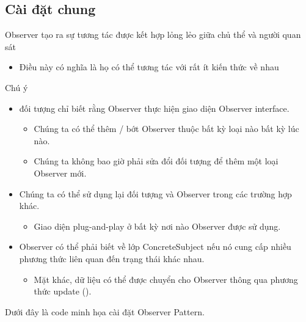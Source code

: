 \subsection{Cài đặt chung}
Observer tạo ra sự tương tác được kết hợp lỏng lẻo giữa chủ thể và người quan sát
\begin{itemize}
    \item Điều này có nghĩa là họ có thể tương tác với rất ít kiến thức về nhau
\end{itemize} 
Chú ý
\begin{itemize}
    \item đối tượng chỉ biết rằng Observer thực hiện giao diện Observer interface.
    \begin{itemize}
        \item Chúng ta có thể thêm / bớt Observer thuộc bất kỳ loại nào bất kỳ lúc nào.
        \item Chúng ta không bao giờ phải sửa đổi đối tượng để thêm một loại Observer mới.
    \end{itemize}
    \item Chúng ta có thể sử dụng lại đối tượng và Observer trong các trường hợp khác.
    \begin{itemize}
        \item Giao diện plug-and-play ở bất kỳ nơi nào Observer được sử dụng.
    \end{itemize}
    \item Observer có thể phải biết về lớp ConcreteSubject nếu nó cung cấp nhiều phương thức liên quan đến trạng thái khác nhau.
    \begin{itemize}
        \item Mặt khác, dữ liệu có thể được chuyển cho Observer thông qua phương thức update ().
    \end{itemize}
\end{itemize}

Dưới đây là code minh họa cài đặt Observer Pattern.

